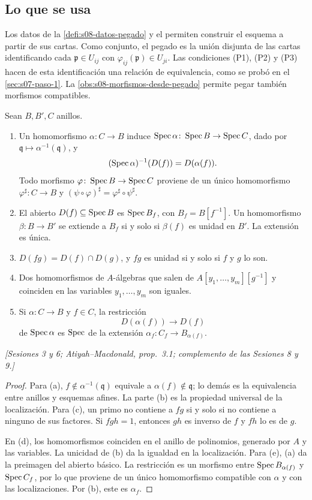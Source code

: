 \subsection{Lo que se usa}

Los datos de la \cref{defi:s08-datos-pegado} y el  permiten construir el esquema a partir de sus cartas. Como conjunto, el pegado es la unión disjunta de las cartas identificando cada $\mathfrak p\in U_{ij}$ con $\varphi_{ij}(\mathfrak p)\in U_{ji}$. Las condiciones (P1), (P2) y (P3) hacen de esta identificación una relación de equivalencia, como se probó en el \cref{sec:s07-paso-1}. La \cref{obs:s08-morfismos-desde-pegado} permite pegar también morfismos compatibles.

\begin{prop}
\label{prop:s08-homomorfismos-abiertos-basicos}
Sean $B,B',C$ anillos.
\begin{enumerate}[label=(\alph*)]
\item Un homomorfismo $\alpha\colon C\to B$ induce $\operatorname{Spec}\alpha\colon \operatorname{Spec} B\to\operatorname{Spec} C$, dado por $\mathfrak q\mapsto\alpha^{-1}(\mathfrak q)$, y
\[
(\operatorname{Spec}\alpha)^{-1}(D(f))=D(\alpha(f)).
\]
Todo morfismo $\varphi\colon \operatorname{Spec} B\to\operatorname{Spec} C$ proviene de un único homomorfismo $\varphi^\sharp\colon C\to B$ y $(\psi\circ\varphi)^\sharp=\varphi^\sharp\circ\psi^\sharp$.
\item El abierto $D(f)\subseteq\operatorname{Spec} B$ es $\operatorname{Spec} B_f$, con $B_f=B[f^{-1}]$. Un homomorfismo $\beta\colon B\to B'$ se extiende a $B_f$ si y solo si $\beta(f)$ es unidad en $B'$. La extensión es única.
\item $D(fg)=D(f)\cap D(g)$, y $fg$ es unidad si y solo si $f$ y $g$ lo son.
\item Dos homomorfismos de $A$-álgebras que salen de $A[y_1,\ldots,y_m][g^{-1}]$ y coinciden en las variables $y_1,\ldots,y_m$ son iguales.
\item Si $\alpha\colon C\to B$ y $f\in C$, la restricción
\[
D(\alpha(f))\longrightarrow D(f)
\]
de $\operatorname{Spec}\alpha$ es $\operatorname{Spec}$ de la extensión $\alpha_f\colon C_f\to B_{\alpha(f)}$.
\end{enumerate}
\emph{[Sesiones 3 y 6; Atiyah--Macdonald, prop.~3.1; complemento de las Sesiones 8 y 9.]}
\end{prop}
\begin{proof}
Para (a), $f\notin\alpha^{-1}(\mathfrak q)$ equivale a $\alpha(f)\notin\mathfrak q$; lo demás es la equivalencia entre anillos y esquemas afines. La parte (b) es la propiedad universal de la localización. Para (c), un primo no contiene a $fg$ si y solo si no contiene a ninguno de sus factores. Si $fgh=1$, entonces $gh$ es inverso de $f$ y $fh$ lo es de $g$.

En (d), los homomorfismos coinciden en el anillo de polinomios, generado por $A$ y las variables. La unicidad de (b) da la igualdad en la localización. Para (e), (a) da la preimagen del abierto básico. La restricción es un morfismo entre $\operatorname{Spec} B_{\alpha(f)}$ y $\operatorname{Spec} C_f$, por lo que proviene de un único homomorfismo compatible con $\alpha$ y con las localizaciones. Por (b), este es $\alpha_f$.
\end{proof}


